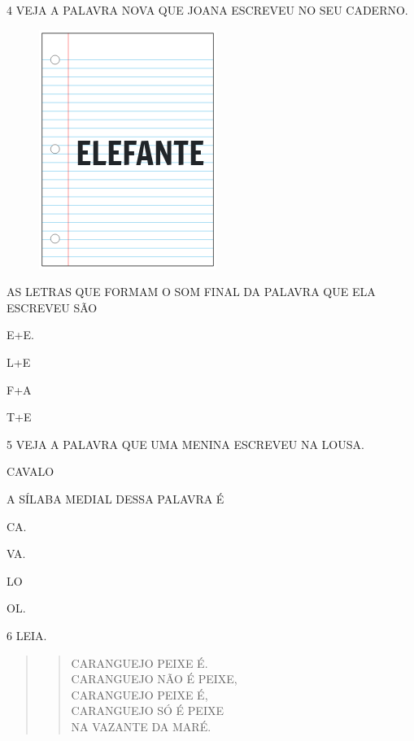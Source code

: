 \pagebreak
\num{4} VEJA A PALAVRA NOVA QUE JOANA ESCREVEU NO SEU CADERNO.

\begin{figure}[htpb]
\centering
\includegraphics[width=.25\textwidth]{media/image230.png}
\end{figure}

AS LETRAS QUE FORMAM O SOM FINAL DA PALAVRA QUE ELA ESCREVEU SÃO

\begin{escolha}
\item E+E.

\item L+E

\item F+A

\item T+E
\end{escolha}

\num{5} VEJA A PALAVRA QUE UMA MENINA ESCREVEU NA LOUSA.

\begin{myquote}
CAVALO
\end{myquote}

A SÍLABA MEDIAL DESSA PALAVRA É

\begin{escolha}
\item CA.

\item VA.

\item LO

\item OL.
\end{escolha}

\pagebreak
\num{6} LEIA.

\begin{quote}
\begin{verse}
CARANGUEJO PEIXE É.\\
CARANGUEJO NÃO É PEIXE,\\
CARANGUEJO PEIXE É,\\
CARANGUEJO SÓ É PEIXE\\
NA VAZANTE DA MARÉ.
\end{verse}

\end{quote}


